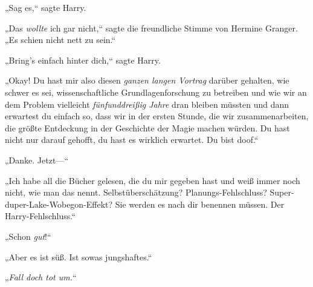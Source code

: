 „Sag es,“ sagte Harry.

„Das \emph{wollte} ich gar nicht,“ sagte die freundliche Stimme von Hermine Granger. „Es schien nicht nett zu sein.“

„Bring's einfach hinter dich,“ sagte Harry.

„Okay! Du hast mir also diesen \emph{ganzen langen Vortrag} darüber gehalten, wie schwer es sei, wissenschaftliche Grundlagenforschung zu betreiben und wie wir an dem Problem vielleicht \emph{fünfunddreißig Jahre} dran bleiben müssten und dann erwartest du einfach so, dass wir in der ersten Stunde, die wir zusammenarbeiten, die größte Entdeckung in der Geschichte der Magie machen würden. Du hast nicht nur darauf gehofft, du hast es wirklich erwartet. Du bist doof.“

„Danke. Jetzt—“

„Ich habe all die Bücher gelesen, die du mir gegeben hast und weiß immer noch nicht, wie man das nennt. Selbstüberschätzung? Planungs-Fehlschluss? Super-duper-Lake-Wobegon-Effekt? Sie werden es nach dir benennen müssen. Der Harry-Fehlschluss.“%

„Schon \emph{gut}!“

„Aber es ist süß. Ist sowas jungshaftes.“

„\emph{Fall doch tot um.}“

